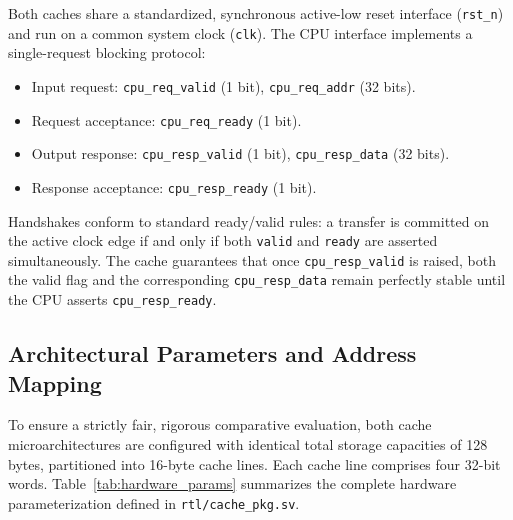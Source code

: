 \documentclass[conference]{IEEEtran}
\begin{document}
Both caches share a standardized, synchronous active-low reset interface (\texttt{rst\_n}) and run on a common system clock (\texttt{clk}). The CPU interface implements a single-request blocking protocol:
\begin{itemize}
    \item Input request: \texttt{cpu\_req\_valid} (1 bit), \texttt{cpu\_req\_addr} (32 bits).
    \item Request acceptance: \texttt{cpu\_req\_ready} (1 bit).
    \item Output response: \texttt{cpu\_resp\_valid} (1 bit), \texttt{cpu\_resp\_data} (32 bits).
    \item Response acceptance: \texttt{cpu\_resp\_ready} (1 bit).
\end{itemize}
Handshakes conform to standard ready/valid rules: a transfer is committed on the active clock edge if and only if both \texttt{valid} and \texttt{ready} are asserted simultaneously. The cache guarantees that once \texttt{cpu\_resp\_valid} is raised, both the valid flag and the corresponding \texttt{cpu\_resp\_data} remain perfectly stable until the CPU asserts \texttt{cpu\_resp\_ready}.

\subsection{Architectural Parameters and Address Mapping}
To ensure a strictly fair, rigorous comparative evaluation, both cache microarchitectures are configured with identical total storage capacities of 128 bytes, partitioned into 16-byte cache lines. Each cache line comprises four 32-bit words. Table~\ref{tab:hardware_params} summarizes the complete hardware parameterization defined in \texttt{rtl/cache\_pkg.sv}.
\end{document}

